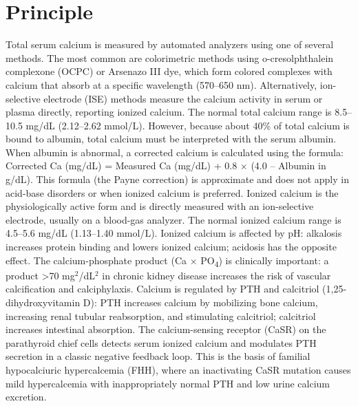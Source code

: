 \section*{Principle}
Total serum calcium is measured by automated analyzers using one of several methods. The most common are colorimetric methods using o-cresolphthalein complexone (OCPC) or Arsenazo III dye, which form colored complexes with calcium that absorb at a specific wavelength (570--650 nm). Alternatively, ion-selective electrode (ISE) methods measure the calcium activity in serum or plasma directly, reporting ionized calcium. The normal total calcium range is 8.5--10.5 mg/dL (2.12--2.62 mmol/L). However, because about 40\% of total calcium is bound to albumin, total calcium must be interpreted with the serum albumin. When albumin is abnormal, a corrected calcium is calculated using the formula: Corrected Ca (mg/dL) = Measured Ca (mg/dL) + 0.8 $\times$ (4.0 -- Albumin in g/dL). This formula (the Payne correction) is approximate and does not apply in acid-base disorders or when ionized calcium is preferred. Ionized calcium is the physiologically active form and is directly measured with an ion-selective electrode, usually on a blood-gas analyzer. The normal ionized calcium range is 4.5--5.6 mg/dL (1.13--1.40 mmol/L). Ionized calcium is affected by pH: alkalosis increases protein binding and lowers ionized calcium; acidosis has the opposite effect. The calcium-phosphate product (Ca $\times$ PO\textsubscript{4}) is clinically important: a product >70 mg$^2$/dL$^2$ in chronic kidney disease increases the risk of vascular calcification and calciphylaxis. Calcium is regulated by PTH and calcitriol (1,25-dihydroxyvitamin D): PTH increases calcium by mobilizing bone calcium, increasing renal tubular reabsorption, and stimulating calcitriol; calcitriol increases intestinal absorption. The calcium-sensing receptor (CaSR) on the parathyroid chief cells detects serum ionized calcium and modulates PTH secretion in a classic negative feedback loop. This is the basis of familial hypocalciuric hypercalcemia (FHH), where an inactivating CaSR mutation causes mild hypercalcemia with inappropriately normal PTH and low urine calcium excretion.

